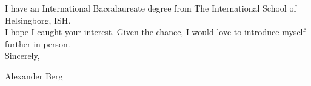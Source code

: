 \documentclass[../main.tex]{subfiles}
\begin{document}
I have an International Baccalaureate degree from The International School of Helsingborg, ISH.
\\

I hope I caught your interest. Given the chance, I would love to introduce myself further in person.
\\

Sincerely, 

Alexander Berg
\end{document}
